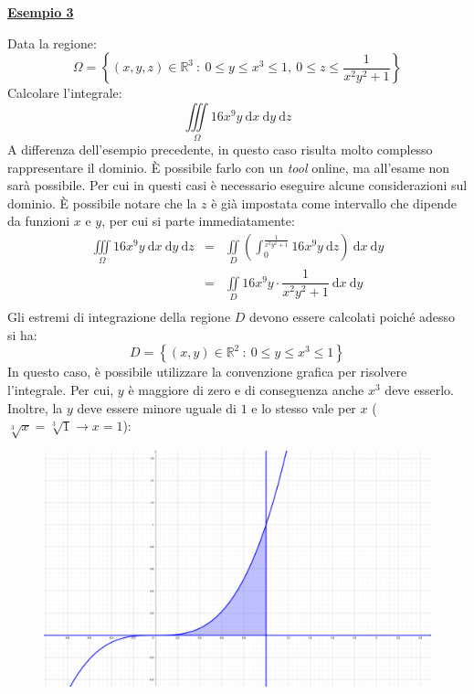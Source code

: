 \documentclass[a4paper]{article}
\newcommand{\example}[1]{\textcolor{Green4}{\textbf{#1}}}
\begin{document}
	\begin{flushleft}
		\example{\underline{Esempio 3}}
	\end{flushleft}
	Data la regione:
	\begin{equation*}
		\Omega = \left\{\left(x,y,z\right) \in \mathbb{R}^{3} \: : \: 0 \le y \le x^{3} \le 1, \: 0 \le z \le \dfrac{1}{x^{2}y^{2} + 1}\right\}
	\end{equation*}
	Calcolare l'integrale:
	\begin{equation*}
		\displaystyle\iiint\limits_{\Omega} 16x^{9}y \:\mathrm{d}x\:\mathrm{d}y\:\mathrm{d}z
	\end{equation*}
	A differenza dell'esempio precedente, in questo caso risulta molto complesso rappresentare il dominio. È possibile farlo con un \emph{tool} online, ma all'esame non sarà possibile. Per cui in questi casi è necessario eseguire alcune considerazioni sul dominio. È possibile notare che la $z$ è già impostata come intervallo che dipende da funzioni $x$ e $y$, per cui si parte immediatamente:
	\begin{equation*}
		\begin{array}{rcl}
			\displaystyle\iiint\limits_{\Omega} 16x^{9}y \:\mathrm{d}x\:\mathrm{d}y\:\mathrm{d}z
			&=&
			\displaystyle\iint\limits_{D} \left(\int_{0}^{\frac{1}{x^{2}y^{2} + 1}} 16x^{9}y \:\mathrm{d}z\right) \:\mathrm{d}x\:\mathrm{d}y \\ [1.8em]
			&=&
			\displaystyle\iint\limits_{D} 16x^{9}y \cdot \dfrac{1}{x^{2}y^{2} + 1} \:\mathrm{d}x\:\mathrm{d}y \\ [2em]
		\end{array}
	\end{equation*}
	Gli estremi di integrazione della regione $D$ devono essere calcolati poiché adesso si ha:
	\begin{equation*}
		D = \left\{\left(x,y\right) \in \mathbb{R}^{2} \: : \: 0 \le y \le x^{3} \le 1\right\}
	\end{equation*}
	In questo caso, è possibile utilizzare la convenzione grafica per risolvere l'integrale. Per cui, $y$ è maggiore di zero e di conseguenza anche $x^{3}$ deve esserlo. Inoltre, la $y$ deve essere minore uguale di $1$ e lo stesso vale per $x$ ($\sqrt[3]{x} = \sqrt[3]{1} \rightarrow x = 1$):
	\begin{figure}[!htp]
		\centering
		\includegraphics[width=.7\textwidth]{img/integrazione_per_fili_5.pdf}
	\end{figure}\newpage
\end{document}

